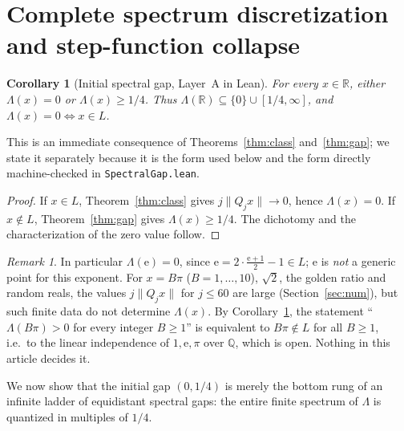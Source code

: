 \documentclass[11pt]{article}
\newtheorem{corollary}[theorem]{Corollary}
\theoremstyle{definition}
\theoremstyle{remark}
\newtheorem{remark}[theorem]{Remark}
\newcommand{\R}{\mathbb{R}}
\newcommand{\Q}{\mathbb{Q}}
\newcommand{\ee}{\mathrm{e}}
\newcommand{\Lam}{\Lambda}
\begin{document}
\section{Complete spectrum discretization and step-function collapse}\label{sec:spectrum}

\begin{corollary}[Initial spectral gap, Layer~A in Lean]\label{thm:spectral}
For every $x\in\R$, either $\Lam(x)=0$ or $\Lam(x)\ge1/4$. Thus
$\Lam(\R)\subseteq\{0\}\cup[1/4,\infty]$, and $\Lam(x)=0\iff x\in L$.
\end{corollary}

This is an immediate consequence of Theorems~\ref{thm:class}
and~\ref{thm:gap}; we state it separately because it is the form used
below and the form directly machine-checked in \texttt{SpectralGap.lean}.

\begin{proof}
If $x\in L$, Theorem~\ref{thm:class} gives $j\|Q_jx\|\to0$, hence $\Lam(x)=0$.
If $x\notin L$, Theorem~\ref{thm:gap} gives $\Lam(x)\ge1/4$. The dichotomy and
the characterization of the zero value follow.
\end{proof}

\begin{remark}\label{rem:linear-indep}
In particular $\Lam(\ee)=0$, since $\ee=2\cdot\frac{\ee+1}{2}-1\in L$; $\ee$ is
\emph{not} a generic point for this exponent. For $x=B\pi$ ($B=1,\dots,10$),
$\sqrt2$, the golden ratio and random reals, the values $j\|Q_jx\|$ for
$j\le60$ are large (Section~\ref{sec:num}), but such finite data do not
determine $\Lam(x)$. By Corollary~\ref{thm:spectral}, the statement
``$\Lam(B\pi)>0$ for every integer $B\ge1$'' is equivalent to
$B\pi\notin L$ for all $B\ge1$, i.e.\ to the linear independence of
$1,\ee,\pi$ over $\Q$, which is open. Nothing in this article decides it.
\end{remark}

We now show that the initial gap $(0,1/4)$ is merely the bottom rung of an
infinite ladder of equidistant spectral gaps: the entire finite spectrum of
$\Lam$ is quantized in multiples of $1/4$.
\end{document}
